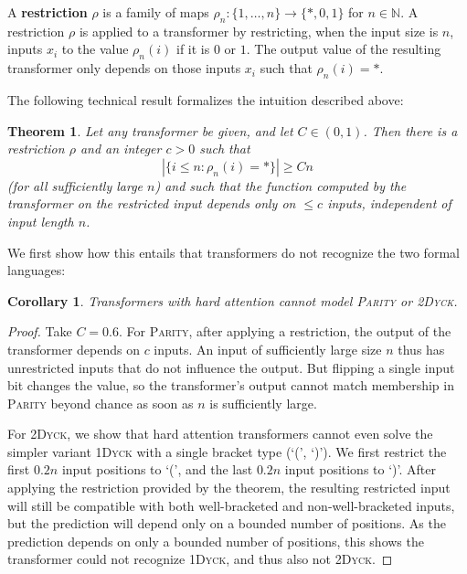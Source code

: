\documentclass[11pt,a4paper]{article}
\newcounter{theorem}
\newtheorem{corollary}[theorem]{Corollary}
\newtheorem{thm}[theorem]{Theorem}
\newcommand{\key}[1]{\textbf{#1}}
\begin{document}
A \key{restriction} $\rho$ is a family of maps $\rho_n : \{1, \dots, n\} \rightarrow \{*, 0, 1\}$ for $n \in \mathbb{N}$.
A restriction $\rho$ is applied to a transformer by restricting, when the input size is $n$, inputs $x_i$ to the value $\rho_n(i)$ if it is $0$ or $1$.
The output value of the resulting transformer only depends on those inputs $x_i$ such that $\rho_n(i) = *$.

The following technical result formalizes the intuition described above:
\begin{thm}\label{thm:hardmax-main}
Let any transformer be given, and let $C \in (0,1)$.
Then there is a restriction $\rho$ and an integer $c > 0$ such that 
$$|\{i \leq n: \rho_n(i) = *\}| \geq Cn$$
(for all sufficiently large $n$) and such that the function computed by the transformer on the restricted input depends only on $\leq c$ inputs, independent of input length $n$.
\end{thm}
We first show how this entails that transformers do not recognize the two formal languages:
\begin{corollary}
Transformers with hard attention cannot model \textsc{Parity} or \textsc{2Dyck}. %
\end{corollary}
\begin{proof}
Take $C=0.6$.
For \textsc{Parity}, after applying a restriction, the output of the transformer depends on $c$ inputs.
An input of sufficiently large size $n$ thus has unrestricted inputs that do not influence the output.
But flipping a single input bit changes the value, so the transformer's output cannot match membership in \textsc{Parity} beyond chance as soon as $n$ is sufficiently large.


For \textsc{2Dyck}, we show that hard attention transformers cannot even solve the simpler variant \textsc{1Dyck} with a single bracket type (`(', `)').
We first restrict the first $0.2n$ input positions to `(', and the last $0.2n$ input positions to `)'.
After applying the restriction provided by the theorem, the resulting restricted input will still be compatible with both well-bracketed and non-well-bracketed inputs, but the prediction will depend only on a bounded number of positions.
As the prediction depends on only a bounded number of positions, this shows the transformer could not recognize \textsc{1Dyck}, and thus also not \textsc{2Dyck}.
%
\end{proof}
\end{document}
